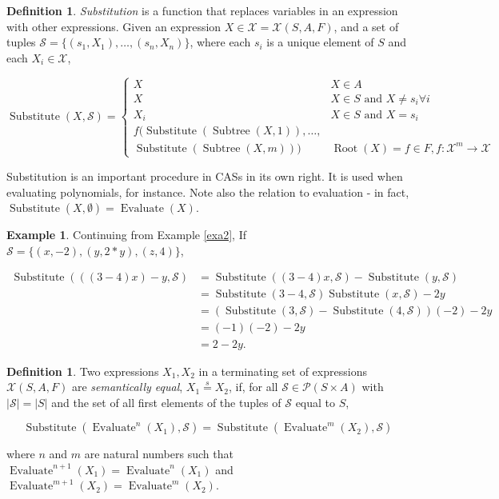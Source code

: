 \documentclass{article}
\theoremstyle{definition}
\newtheorem{defin}[thm]{Definition}
\newtheorem{exa}[thm]{Example}
\DeclareMathOperator{\subs}{Substitute}
\DeclareMathOperator{\Root}{Root}
\DeclareMathOperator{\subtree}{Subtree}
\DeclareMathOperator{\eval}{Evaluate}
\begin{document}
\begin{defin} \label{def3}
    \emph{Substitution} is a function that replaces variables in an expression with other expressions. Given an expression $X \in \mathcal{X} = \mathcal{X}(S, A, F)$, and a set of tuples $\mathcal{S} = \{(s_1, X_1), \ldots , (s_n, X_n)\}$, where each $s_i$ is a unique element of $S$ and each $X_i \in \mathcal{X}$,
    
    \begin{equation*}
        \subs(X, \mathcal{S}) = \begin{cases} 
                                  X & X \in A \\
                                  X &  X \in S \text{ and } X \neq s_i \forall i \\
                                  X_i & X \in S \text{ and } X = s_i\\
                                  f(\subs(\subtree(X, 1)),\ldots, \\ \subs(\subtree(X, m))) & \Root(X) = f \in F, f:\mathcal{X}^m\to\mathcal{X}
                               \end{cases}
    \end{equation*}
\end{defin} 

Substitution is an important procedure in CASs in its own right. It is used when evaluating polynomials, for instance. Note also the relation to evaluation - in fact, $\subs(X, \emptyset) = \eval(X)$.

\begin{exa}
    Continuing from Example \ref{exa2}, If $\mathcal{S} = \{(x, -2), (y, 2*y), (z, 4)\}$,
    
    \begin{align*}
            \subs(((3 - 4)x) - y, \mathcal{S}) &= \subs((3-4)x, \mathcal{S})-\subs(y, \mathcal{S})\\
                        &= \subs(3-4, \mathcal{S})\subs(x, \mathcal{S}) - 2y \\
                        &= (\subs(3, \mathcal{S})-\subs(4, \mathcal{S}))(-2)-2y\\
                        &= (-1)(-2)-2y\\
                        &= 2-2y.
    \end{align*}
\end{exa}

\begin{defin}  \label{def4}
    Two expressions $X_1, X_2$ in a terminating set of expressions $\mathcal{X}(S, A, F)$ are \emph{semantically equal}, $X_1\overset{s}{=}X_2$, if, for all $\mathcal{S} \in \mathcal{P}(S \times A)$ with $|\mathcal{S}| = |S|$ and the set of all first elements of the tuples of $\mathcal{S}$ equal to $S$,
    
    \begin{equation*}
        \subs(\eval^n(X_1), \mathcal{S}) = \subs(\eval^m(X_2), \mathcal{S})
    \end{equation*}
    
    where $n$ and $m$ are natural numbers such that $\eval^{n+1}(X_1) = \eval^n(X_1)$ and $\eval^{m+1}(X_2) = \eval^m(X_2)$.
\end{defin}
\end{document}
